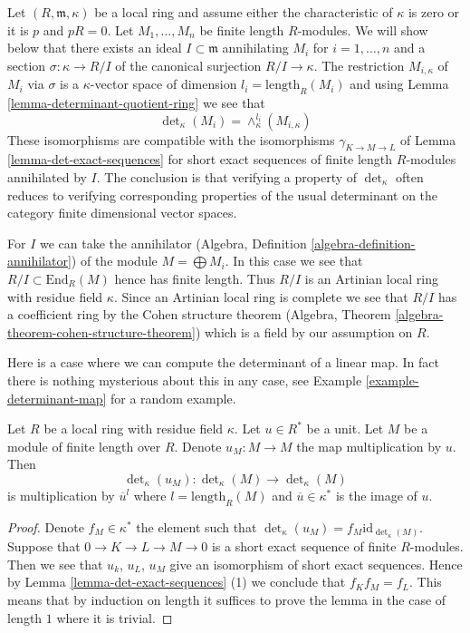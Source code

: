 \begin{remark}
\label{remark-explain-determinant}
Let $(R, \mathfrak m, \kappa)$ be a local ring and assume either
the characteristic of $\kappa$ is zero or it is $p$ and $p R = 0$.
Let $M_1, \ldots, M_n$ be finite length $R$-modules.
We will show below that there exists an
ideal $I \subset \mathfrak m$ annihilating $M_i$ for $i = 1, \ldots, n$
and a section $\sigma : \kappa \to R/I$ of the canonical surjection
$R/I \to \kappa$. The restriction $M_{i, \kappa}$ of $M_i$ via $\sigma$
is a $\kappa$-vector space of dimension $l_i = \text{length}_R(M_i)$ and
using Lemma \ref{lemma-determinant-quotient-ring} we see that
$$
\det\nolimits_\kappa(M_i) = \wedge_\kappa^{l_i}(M_{i, \kappa})
$$
These isomorphisms are compatible with the isomorphisms
$\gamma_{K \to M \to L}$ of Lemma \ref{lemma-det-exact-sequences}
for short exact sequences of finite length $R$-modules annihilated
by $I$. The conclusion is that verifying a property of
$\det_\kappa$ often reduces to verifying corresponding properties
of the usual determinant on the category finite dimensional vector
spaces.

\medskip\noindent
For $I$ we can take the annihilator
(Algebra, Definition \ref{algebra-definition-annihilator})
of the module $M = \bigoplus M_i$. In this case we see that
$R/I \subset \text{End}_R(M)$ hence has finite length.
Thus $R/I$ is an Artinian local ring with residue field $\kappa$.
Since an Artinian local ring is complete we see that $R/I$
has a coefficient ring by the Cohen structure theorem
(Algebra, Theorem \ref{algebra-theorem-cohen-structure-theorem})
which is a field by our assumption on $R$.
\end{remark}

\noindent
Here is a case where we can compute the determinant of a linear map.
In fact there is nothing mysterious about this in any case, see
Example \ref{example-determinant-map} for a random example.

\begin{lemma}
\label{lemma-times-u-determinant}
Let $R$ be a local ring with residue field $\kappa$.
Let $u \in R^*$ be a unit.
Let $M$ be a module of finite length over $R$.
Denote $u_M : M \to M$ the map multiplication by $u$.
Then
$$
\det\nolimits_\kappa(u_M) :
\det\nolimits_\kappa(M)
\longrightarrow
\det\nolimits_\kappa(M)
$$
is multiplication by $\overline{u}^l$ where $l = \text{length}_R(M)$
and $\overline{u} \in \kappa^*$ is the image of $u$.
\end{lemma}

\begin{proof}
Denote $f_M \in \kappa^*$ the element such that
$\det\nolimits_\kappa(u_M) = f_M \text{id}_{\det\nolimits_\kappa(M)}$.
Suppose that $0 \to K \to L \to M \to 0$ is a short
exact sequence of finite $R$-modules. Then we see that
$u_k$, $u_L$, $u_M$ give an isomorphism of short exact sequences.
Hence by Lemma \ref{lemma-det-exact-sequences} (1) we conclude that
$f_K f_M = f_L$.
This means that by induction on length it suffices to prove the
lemma in the case of length $1$ where it is trivial.
\end{proof}

